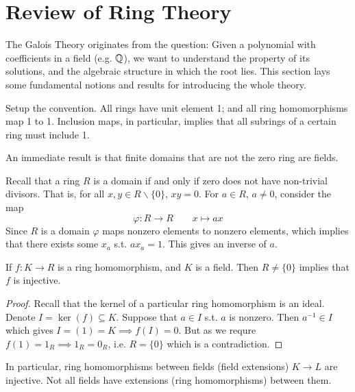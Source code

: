 \documentclass{article}
\begin{document}

\tableofcontents
\newpage

\section{Review of Ring Theory}

\textstart
The Galois Theory originates from the question: Given a polynomial with coefficients in a field (e.g. $\mathbb{Q}$), we want to understand the property of its solutions, and the algebraic structure in which the root lies. This section lays some fundamental notions and results for introducing the whole theory.

Setup the convention. All rings have unit element 1; and all ring homomorphisms map 1 to 1. Inclusion maps, in particular, implies that all subrings of a certain ring must include 1.

\begin{remark}
    An immediate result is that finite domains that are not the zero ring are fields.

    Recall that a ring $R$ is a domain if and only if zero does not have non-trivial divisors. That is, for all $x, y \in R \smallsetminus \{0\}$, $xy = 0$. For $a \in R$, $a \neq 0$, consider the map 
    \[
        \varphi: R \to R \qquad x \mapsto ax
    \]
    Since $R$ is a domain $\varphi$ maps nonzero elements to nonzero elements, which implies that there exists some $x_a$ s.t. $a x_a = 1$. This gives an inverse of $a$.
\end{remark}

\begin{proposition}\label{prop: ring homs from a field are injective}
    If $f: K \to R$ is a ring homomorphism, and $K$ is a field. Then $R \neq \{0\}$ implies that $f$ is injective.
\end{proposition}

\begin{proof}
    Recall that the kernel of a particular ring homomorphism is an ideal. Denote $I = \ker (f) \subseteq K$. Suppose that $a \in I$ s.t. $a$ is nonzero. Then $a^{-1} \in I$ which gives $I = (1) = K \implies f(I) = 0$. But as we requre $f(1) = 1_R \implies 1_R = 0_R$, i.e. $R = \{0\}$ which is a contradiction.
\end{proof}

\begin{corollary}
    In particular, ring homomorphisms between fields (field extensions) $K \to L$ are injective. Not all fields have extensions (ring homomorphisms) between them.
\end{corollary}
\end{document}
